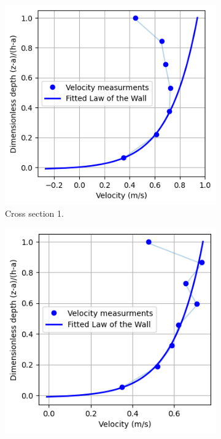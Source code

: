 \begin{figure}[H]
    \centering
    \begin{subfigure}[b]{0.32\linewidth}
        \includegraphics[width=\linewidth]{figures/ch6/cs1_vel_profile.png}
        \caption{Cross section 1.}
    \end{subfigure}
    \hfill
    \begin{subfigure}[b]{0.32\linewidth}
        \includegraphics[width=\linewidth]{figures/ch6/cs2_vel_profile.png}

\end{subfigure}
\end{figure}
